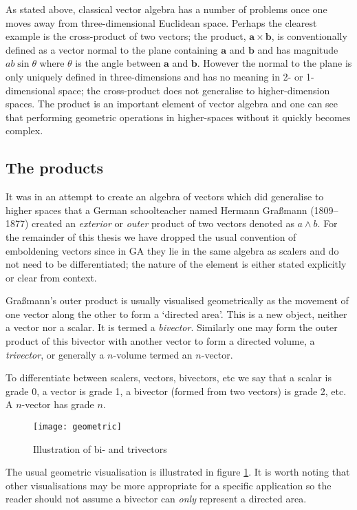 As stated above, classical vector algebra has a number of problems once one
moves away from three-dimensional Euclidean space. Perhaps the clearest
example is the cross-product of two vectors; the product, $\mathbf{a} \times
\mathbf{b}$, is conventionally defined as a vector normal to the plane
containing $\mathbf{a}$ and $\mathbf{b}$ and has magnitude $ab\sin\theta$
where $\theta$ is the angle between $\mathbf{a}$ and $\mathbf{b}$. However the
normal to the plane is only uniquely defined in three-dimensions and has no
meaning in 2- or 1-dimensional space; the cross-product does not generalise to
higher-dimension spaces. The product is an important element of vector algebra
and one can see that performing geometric operations in higher-spaces without
it quickly becomes complex.

\subsection{The products}

It was in an attempt\cite{GA:grassmann} to create an algebra of vectors which
did generalise to higher spaces that a German schoolteacher named Hermann
Gra{\ss}mann (1809--1877) created an \emph{exterior} or \emph{outer} product
of two vectors denoted as $a \wedge b$. For the remainder of this thesis we
have dropped the usual convention of emboldening vectors since in GA they lie
in the same algebra as scalers and do not need to be differentiated; the
nature of the element is either stated explicitly or clear from context.

Gra{\ss}mann's outer product is usually visualised geometrically as the
movement of one vector along the other to form a `directed area'. This is a
new object, neither a vector nor a scalar. It is termed a \emph{bivector}.
Similarly one may form the outer product of this bivector with another vector
to form a directed volume, a \emph{trivector}, or generally a $n$-volume
termed an $n$-vector. 

To differentiate between scalers, vectors, bivectors, etc we say that a scalar
is grade 0, a vector is grade 1, a bivector (formed from two vectors) is grade
2, etc. A $n$-vector has grade $n$.

\begin{figure}
\centering
\texttt{[image: geometric]}
\caption{Illustration of bi- and trivectors\label{fig:geometric}}
\end{figure}

The usual geometric visualisation is illustrated in figure \ref{fig:geometric}.
It is worth noting that other visualisations may be more appropriate for a specific
application so the reader should not assume a bivector can \emph{only} represent a
directed area. 

